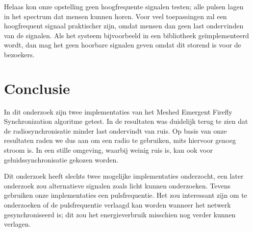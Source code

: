 \documentclass[a4paper,10pt]{article}
\begin{document}
Helaas kon onze opstelling geen hoogfrequente signalen testen; alle pulsen lagen in het spectrum dat mensen kunnen horen. Voor veel toepassingen zal een hoogfrequent signaal praktischer zijn, omdat mensen dan geen last ondervinden van de signalen. Als het systeem bijvoorbeeld in een bibliotheek ge\"implementeerd wordt, dan mag het geen hoorbare signalen geven omdat dit storend is voor de bezoekers.

\section{Conclusie}\label{sec:conclusie}
In dit onderzoek zijn twee implementaties van het Meshed Emergent Firefly Synchronization algoritme getest. In de resultaten was duidelijk terug te zien dat de radiosynchronisatie minder last ondervindt van ruis. Op basis van onze resultaten raden we dus aan om een radio te gebruiken, mits hiervoor genoeg stroom is. In een stille omgeving, waarbij weinig ruis is, kan ook voor geluidssynchronisatie gekozen worden.

Dit onderzoek heeft slechts twee mogelijke implementaties onderzocht, een later onderzoek zou alternatieve signalen zoals licht kunnen onderzoeken. Tevens gebruiken onze implementaties een pulsfrequentie. Het zou interessant zijn om te onderzoeken of de pulsfrequentie verlaagd kan worden wanneer het netwerk gesynchroniseerd is; dit zou het energieverbruik misschien nog verder kunnen verlagen.

% 



\end{document}
